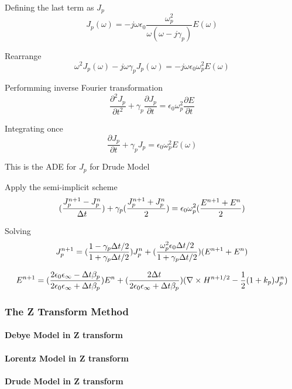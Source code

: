 Defining the last term as $J_p$
\begin{displaymath}
  J_p(\omega) = -j\omega\epsilon_0\frac{\omega_p^2}{\omega(\omega-j\gamma_p)}E(\omega)
\end{displaymath}

Rearrange
\begin{displaymath}
  \omega^2J_p(\omega) - j\omega\gamma_pJ_p(\omega) = -j\omega\epsilon_0\omega_p^2 E(\omega)
\end{displaymath}

Performming inverse Fourier transformation
\begin{displaymath}
  \frac{\partial^2 J_p}{\partial t^2} + \gamma_p \frac{\partial J_p}{\partial t} = \epsilon_0\omega_p^2\frac{\partial E}{\partial t}
\end{displaymath}

Integrating once
\begin{displaymath}
  \frac{\partial J_p}{\partial t} + \gamma_p J_p = \epsilon_0 \omega_p^2 E(\omega)
\end{displaymath}

This is the ADE for $J_p$ for Drude Model

Apply the semi-implicit scheme
\begin{displaymath}
  \Huge(\frac{J_p^{n+1} - J_p^n}{\Delta t}\Huge) + \gamma_{p}\Huge(\frac{J_p^{n+1} + J_p^n}{2}\Huge) = \epsilon_0\omega_p^2\Huge(\frac{E^{n+1} + E^n}{2}\Huge)
\end{displaymath}

Solving
\begin{displaymath}
  J_p^{n+1} = \Huge(\frac{1-\gamma_p\Delta t /2}{1+\gamma_p\Delta t /2}\Huge)J_p^n + \Huge(\frac{\omega_p^2\epsilon_0\Delta t /2}{1+\gamma_p\Delta t /2}\Huge)(E^{n+1}+E^n)
\end{displaymath}


\begin{displaymath}
  E^{n+1} = \Huge(\frac{2\epsilon_0\epsilon_{\infty} - \Delta t \beta_p}{2\epsilon_0\epsilon_{\infty} + \Delta t \beta_p}\Huge)E^n + \Huge(\frac{2\Delta t}{2\epsilon_0\epsilon_{\infty} + \Delta t \beta_p}\Huge)\Huge(\nabla\times H^{n+1/2} - \frac{1}{2}(1+k_p)J_p^n\Huge)
\end{displaymath}



\subsubsection{The Z Transform Method}
\paragraph{Debye Model in Z transform}

\paragraph{Lorentz Model in Z transform}

\paragraph{Drude Model in Z transform}

